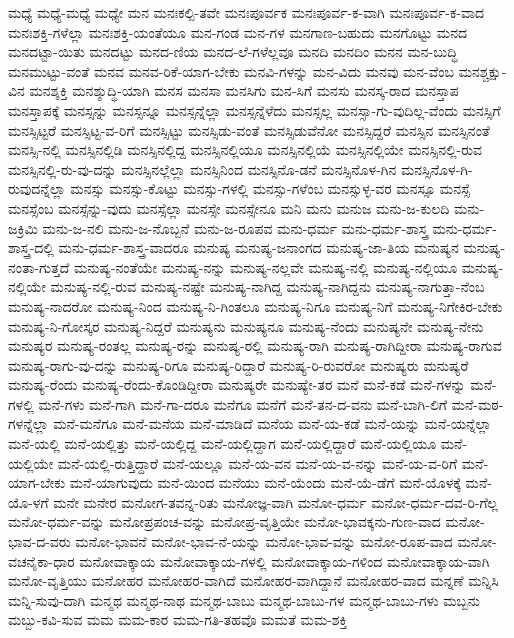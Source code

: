 {ಮಧ್ಯೆ
ಮಧ್ಯೆ-ಮಧ್ಯೆ
ಮಧ್ಯೇ
ಮನ
ಮನಃಕಲ್ಪಿ-ತವೇ
ಮನಃಪೂರ್ವಕ
ಮನಃಪೂರ್ವ-ಕ-ವಾಗಿ
ಮನಃಪೂರ್ವ-ಕ-ವಾದ
ಮನಃಶಕ್ತಿ-ಗಳೆಲ್ಲಾ
ಮನಃಶಕ್ತಿ-ಯಂತೆಯೂ
ಮನ-ಗಂಡ
ಮನ-ಗಳ
ಮನಗಾಣ-ಬಹುದು
ಮನಗೊಟ್ಟು
ಮನದ
ಮನದಟ್ಟಾ-ಯಿತು
ಮನದಟ್ಟು
ಮನದ-ಣಿಯ
ಮನದ-ಲೆ-ಗಳೆಲ್ಲವೂ
ಮನದಿ
ಮನದಿಂ
ಮನನ
ಮನ-ಬುದ್ಧಿ
ಮನಮುಟ್ಟು-ವಂತೆ
ಮನವ
ಮನವ-ರಿಕೆ-ಯಾಗ-ಬೇಕು
ಮನವಿ-ಗಳನ್ನು
ಮನ-ವಿದು
ಮನವು
ಮನ-ವೆಂಬ
ಮನಶ್ಚಕ್ಷು-ವಿನ
ಮನಶ್ಶಕ್ತಿ
ಮನಶ್ಶುದ್ಧಿ-ಯಾಗಿ
ಮನಸ
ಮನಸಾ
ಮನಸಿಗು
ಮನ-ಸಿಗೆ
ಮನಸು
ಮನಸ್ಕ-ರಾದ
ಮನಸ್ತಾಪ
ಮನಸ್ತಾಪಕ್ಕೆ
ಮನಸ್ಸನ್ನು
ಮನಸ್ಸನ್ನೂ
ಮನಸ್ಸನ್ನೆಲ್ಲಾ
ಮನಸ್ಸನ್ನೆಳೆದು
ಮನಸ್ಸಲ್ಲ
ಮನಸ್ಸಾ-ಗು-ವುದಿಲ್ಲ-ವೆಂದು
ಮನಸ್ಸಿಗೆ
ಮನಸ್ಸಿಟ್ಟರೆ
ಮನಸ್ಸಿಟ್ಟ-ವ-ರಿಗೆ
ಮನಸ್ಸಿಟ್ಟು
ಮನಸ್ಸಿಡು-ವಂತೆ
ಮನಸ್ಸಿಡುವೆನೋ
ಮನಸ್ಸಿದ್ದರೆ
ಮನಸ್ಸಿನ
ಮನಸ್ಸಿನಂತೆ
ಮನಸ್ಸಿ-ನಲ್ಲಿ
ಮನಸ್ಸಿನಲ್ಲಿಡಿ
ಮನಸ್ಸಿನಲ್ಲಿದ್ದ
ಮನಸ್ಸಿನಲ್ಲಿಯೂ
ಮನಸ್ಸಿನಲ್ಲಿಯೆ
ಮನಸ್ಸಿನಲ್ಲಿಯೇ
ಮನಸ್ಸಿನಲ್ಲಿ-ರುವ
ಮನಸ್ಸಿನಲ್ಲಿ-ರು-ವು-ದನ್ನು
ಮನಸ್ಸಿನಲ್ಲೆಲ್ಲಾ
ಮನಸ್ಸಿನಿಂದ
ಮನಸ್ಸಿನೊ-ಡನೆ
ಮನಸ್ಸಿನೊಳ-ಗಿನ
ಮನಸ್ಸಿನೊಳ-ಗಿ-ರುವುದನ್ನೆಲ್ಲಾ
ಮನಸ್ಸು
ಮನಸ್ಸು-ಕೊಟ್ಟು
ಮನಸ್ಸು-ಗಳಲ್ಲಿ
ಮನಸ್ಸು-ಗಳೆಂಬ
ಮನಸ್ಸುಳ್ಳ-ವರ
ಮನಸ್ಸೂ
ಮನಸ್ಸೆ
ಮನಸ್ಸೆಂಬ
ಮನಸ್ಸೆನ್ನು-ವುದು
ಮನಸ್ಸೆಲ್ಲಾ
ಮನಸ್ಸೇ
ಮನಸ್ಸೇನೂ
ಮನಿ
ಮನು
ಮನುಜ
ಮನು-ಜ-ಕುಲದಿ
ಮನು-ಜಕ್ರಿಮಿ
ಮನು-ಜ-ನಲಿ
ಮನು-ಜ-ನೊಬ್ಬನೆ
ಮನು-ಜ-ರೂಪವ
ಮನು-ಧರ್ಮ
ಮನು-ಧರ್ಮ-ಶಾಸ್ತ್ರ
ಮನು-ಧರ್ಮ-ಶಾಸ್ತ್ರ-ದಲ್ಲಿ
ಮನು-ಧರ್ಮ-ಶಾಸ್ತ್ರ-ವಾದರೂ
ಮನುಷ್ಯ
ಮನುಷ್ಯ-ಜನಾಂಗದ
ಮನುಷ್ಯ-ಜಾ-ತಿಯ
ಮನುಷ್ಯನ
ಮನುಷ್ಯ-ನಂತಾ-ಗುತ್ತದೆ
ಮನುಷ್ಯ-ನಂತೆಯೇ
ಮನುಷ್ಯ-ನನ್ನು
ಮನುಷ್ಯ-ನಲ್ಲವೇ
ಮನುಷ್ಯ-ನಲ್ಲಿ
ಮನುಷ್ಯ-ನಲ್ಲಿಯೂ
ಮನುಷ್ಯ-ನಲ್ಲಿಯೇ
ಮನುಷ್ಯ-ನಲ್ಲಿ-ರುವ
ಮನುಷ್ಯ-ನಷ್ಟೇ
ಮನುಷ್ಯ-ನಾಗಿದ್ದ
ಮನುಷ್ಯ-ನಾಗಿದ್ದನು
ಮನುಷ್ಯ-ನಾಗುತ್ತಾ-ನೆಂಬ
ಮನುಷ್ಯ-ನಾದರೋ
ಮನುಷ್ಯ-ನಿಂದ
ಮನುಷ್ಯ-ನಿ-ಗಿಂತಲೂ
ಮನುಷ್ಯ-ನಿಗೂ
ಮನುಷ್ಯ-ನಿಗೆ
ಮನುಷ್ಯ-ನಿಗೇಕಿರ-ಬೇಕು
ಮನುಷ್ಯ-ನಿ-ಗೋಸ್ಕರ
ಮನುಷ್ಯ-ನಿದ್ದರೆ
ಮನುಷ್ಯನು
ಮನುಷ್ಯನೂ
ಮನುಷ್ಯ-ನೆಂದು
ಮನುಷ್ಯನೇ
ಮನುಷ್ಯ-ನೇನು
ಮನುಷ್ಯರ
ಮನುಷ್ಯ-ರಂತಲ್ಲ
ಮನುಷ್ಯ-ರನ್ನು
ಮನುಷ್ಯ-ರಲ್ಲಿ
ಮನುಷ್ಯ-ರಾಗಿ
ಮನುಷ್ಯ-ರಾಗಿದ್ದೀರಾ
ಮನುಷ್ಯ-ರಾಗುವ
ಮನುಷ್ಯ-ರಾಗು-ವು-ದನ್ನು
ಮನುಷ್ಯ-ರಿಗೂ
ಮನುಷ್ಯ-ರಿದ್ದಾರೆ
ಮನುಷ್ಯ-ರಿ-ರುವರೋ
ಮನುಷ್ಯರು
ಮನುಷ್ಯರೆ
ಮನುಷ್ಯ-ರೆಂದು
ಮನುಷ್ಯ-ರೆಂದು-ಕೊಂಡಿದ್ದೀರಾ
ಮನುಷ್ಯರೇ
ಮನುಷ್ಯೇ-ತರ
ಮನೆ
ಮನೆ-ಕಡೆ
ಮನೆ-ಗಳನ್ನು
ಮನೆ-ಗಳಲ್ಲಿ
ಮನೆ-ಗಳು
ಮನೆ-ಗಾಗಿ
ಮನೆ-ಗಾ-ದರೂ
ಮನೆಗೂ
ಮನೆಗೆ
ಮನೆ-ತನ-ದ-ವನು
ಮನೆ-ಬಾಗಿ-ಲಿಗೆ
ಮನೆ-ಮಠ-ಗಳನ್ನೆಲ್ಲಾ
ಮನೆ-ಮನೆಗೂ
ಮನೆ-ಮನೆಯ
ಮನೆ-ಮಾಡಿದೆ
ಮನೆಯ
ಮನೆ-ಯ-ಕಡೆ
ಮನೆ-ಯನ್ನು
ಮನೆ-ಯನ್ನೆಲ್ಲಾ
ಮನೆ-ಯಲ್ಲಿ
ಮನೆ-ಯಲ್ಲಿತ್ತು
ಮನೆ-ಯಲ್ಲಿದ್ದ
ಮನೆ-ಯಲ್ಲಿದ್ದಾಗ
ಮನೆ-ಯಲ್ಲಿದ್ದಾರೆ
ಮನೆ-ಯಲ್ಲಿಯೂ
ಮನೆ-ಯಲ್ಲಿಯೇ
ಮನೆ-ಯಲ್ಲಿ-ರುತ್ತಿದ್ದಾರೆ
ಮನೆ-ಯಲ್ಲೂ
ಮನೆ-ಯ-ವನ
ಮನೆ-ಯ-ವ-ನನ್ನು
ಮನೆ-ಯ-ವ-ರಿಗೆ
ಮನೆ-ಯಾಗ-ಬೇಕು
ಮನೆ-ಯಾಗುವುದು
ಮನೆ-ಯಿಂದ
ಮನೆಯು
ಮನೆ-ಯೆಂದು
ಮನೆ-ಯೆ-ಡೆಗೆ
ಮನೆ-ಯೊಳಕ್ಕೆ
ಮನೆ-ಯೊ-ಳಗೆ
ಮನೇ
ಮನೇರ
ಮನೋಗ-ತವನ್ನ-ರಿತು
ಮನೋಜ್ಞ-ವಾಗಿ
ಮನೋ-ಧರ್ಮ
ಮನೋ-ಧರ್ಮ-ದವ-ರಿ-ಗೆಲ್ಲ
ಮನೋ-ಧರ್ಮ-ವನ್ನು
ಮನೋಪ್ರಪಂಚ-ವನ್ನು
ಮನೋಪ್ರ-ವೃತ್ತಿಯೇ
ಮನೋ-ಭಾವಕ್ಕನು-ಗುಣ-ವಾದ
ಮನೋ-ಭಾವ-ದ-ವರು
ಮನೋ-ಭಾವನೆ
ಮನೋ-ಭಾವ-ನೆ-ಯನ್ನು
ಮನೋ-ಭಾವ-ವನ್ನು
ಮನೋ-ರೂಪ-ವಾದ
ಮನೋ-ವಚನೈಕಾ-ಧಾರ
ಮನೋವಾಕ್ಕಾಯ
ಮನೋವಾಕ್ಕಾಯ-ಗಳಲ್ಲಿ
ಮನೋವಾಕ್ಕಾಯ-ಗಳಿಂದ
ಮನೋವಾಕ್ಕಾಯ-ವಾಗಿ
ಮನೋ-ವೃತ್ತಿಯು
ಮನೋಹರ
ಮನೋಹರ-ವಾಗಿದೆ
ಮನೋಹರ-ವಾಗಿದ್ದಾನೆ
ಮನೋಹರ-ವಾದ
ಮನ್ನಣೆ
ಮನ್ನಿಸಿ
ಮನ್ನಿ-ಸುವು-ದಾಗಿ
ಮನ್ಮಥ
ಮನ್ಮಥ-ನಾಥ
ಮನ್ಮಥ-ಬಾಬು
ಮನ್ಮಥ-ಬಾಬು-ಗಳ
ಮನ್ಮಥ-ಬಾಬು-ಗಳು
ಮಬ್ಬನು
ಮಬ್ಬು-ಕವಿ-ಸುವ
ಮಮ
ಮಮ-ಕಾರ
ಮಮ-ಗತಿ-ತಹವೊ
ಮಮತೆ
ಮಮ-ಶಕ್ತಿ
}
